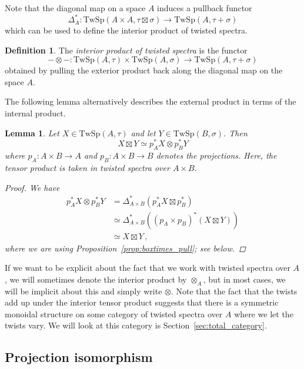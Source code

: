 \documentclass[10pt]{amsart}
\newcommand{\longto}{\longrightarrow}
\theoremstyle{plain}
\newtheorem{lemma}[theorem]{Lemma}
\theoremstyle{definition}
\newtheorem{definition}[theorem]{Definition}
\newcommand{\TwSp}{\mathrm{TwSp}}
\begin{document}
Note that the diagonal map on a space $A$ induces a pullback functor
\[
\Delta^*_A : \TwSp(A \times A , \tau \boxtimes \sigma) \longto \TwSp(A,\tau + \sigma)
\]
which can be used to define the interior product of twisted spectra.

\begin{definition} \label{defn:interior_tensor}
  The \emph{interior product of twisted spectra} is the functor
  \[
  - \otimes - : \TwSp(A,\tau) \times \TwSp(A,\sigma) \longto \TwSp(A , \tau + \sigma)
  \]
  obtained by pulling the exterior product back along the diagonal map on the space $A$.
\end{definition}

The following lemma alternatively describes the external product in terms of the internal product.

\begin{lemma} \label{lem:boxtimes_proj_pullbacks}
  Let $X \in \TwSp(A,\tau)$ and let $Y \in \TwSp(B,\sigma)$. Then
  \[
  X \boxtimes Y \simeq p_A^* X \otimes p_B^* Y
  \]
  where $p_A :  A\times B \to A$ and $p_B : A \times B \to B$ denotes the projections. Here, the tensor product is taken in twisted spectra over $A \times B$.
  \begin{proof}
    We have
    \begin{align*}
    p^*_A X \otimes p_B^* Y &= \Delta^{*}_{A \times B}(p_A^* X \boxtimes p_B^*) \\ &\simeq \Delta_{A \times B}^*((p_A \times p_B)^*(X \boxtimes Y)) \\ &\simeq X \boxtimes Y \,,
  \end{align*}
  where we are using Proposition~\ref{prop:boxtimes_pull}; see below.
  \end{proof}
\end{lemma}

If we want to be explicit about the fact that we work with twisted spectra over $A$, we will sometimes denote the interior product by $\otimes_A$, but in most cases, we will be implicit about this and simply write $\otimes$.
Note that the fact that the twists add up under the interior tensor product suggests that there is a symmetric monoidal structure on some category of twisted spectra over $A$ where we let the twists vary.
We will look at this category is Section~\ref{sec:total_category}.

\subsection{Projection isomorphism}
\end{document}
